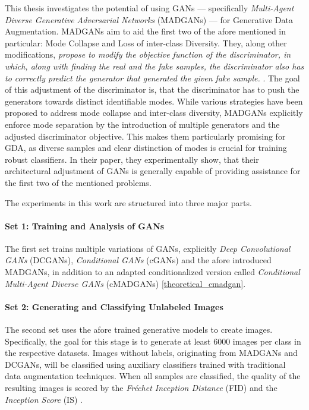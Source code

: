 This thesis investigates the potential of using GANs --- specifically \textit{Multi-Agent Diverse Generative Adversarial Networks} (MADGANs) \cite{ghosh2018madgan} --- for Generative Data Augmentation. MADGANs aim to aid the first two of the afore mentioned in particular: Mode Collapse and Loss of inter-class Diversity. They, along other modifications, \textit{propose to modify the objective function of the discriminator, in which, along with finding the real and the fake samples, the discriminator also has to correctly predict the generator that generated the given fake sample.} \cite{ghosh2018madgan}. The goal of this adjustment of the discriminator is, that the discriminator has to push the generators towards distinct identifiable modes. While various strategies have been proposed to address mode collapse and inter-class diversity, MADGANs explicitly enforce mode separation by the introduction of multiple generators and the adjusted discriminator objective. This makes them particularly promising for GDA, as diverse samples and clear distinction of modes is crucial for training robust classifiers. In their paper, they experimentally show, that their architectural adjustment of GANs is generally capable of providing assistance for the first two of the mentioned problems.

The experiments in this work are structured into three major parts.

\paragraph{Set 1: Training and Analysis of GANs}  \label{thesis_goal_1}
The first set trains multiple variations of GANs, explicitly \textit{Deep Convolutional GANs} (DCGANs), \textit{Conditional GANs} (cGANs) and the afore introduced MADGANs, in addition to an adapted conditionalized version called \textit{Conditional Multi-Agent Diverse GANs} (cMADGANs) \ref{theoretical_cmadgan}.

\paragraph{Set 2: Generating and Classifying Unlabeled Images}  \label{thesis_goal_2}
The second set uses the afore trained generative models to create images. Specifically, the goal for this stage is to generate at least $6 000$ images per class in the respective datasets. Images without labels, originating from MADGANs and DCGANs, will be classified using auxiliary classifiers trained with traditional data augmentation techniques. When all samples are classified, the quality of the resulting images is scored by the \textit{Fréchet Inception Distance} (FID) \cite{heusel2018ganstrainedtimescaleupdate} and the \textit{Inception Score} (IS) \cite{salimans2016improvedtechniquestraininggans}.

